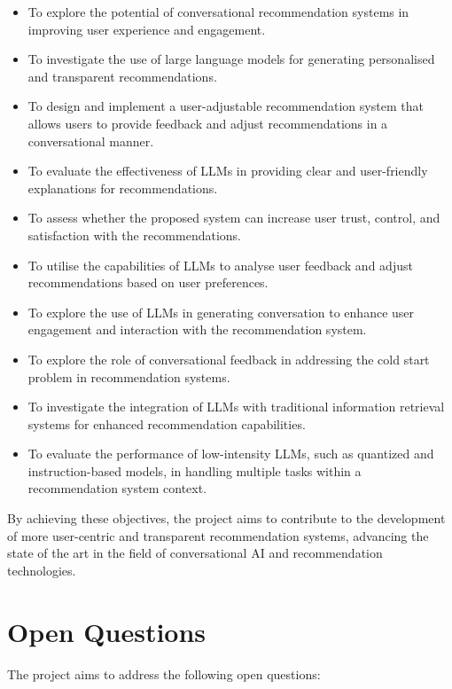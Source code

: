 \begin{itemize}
    \item To explore the potential of conversational recommendation systems in improving user experience and engagement.
    \item To investigate the use of large language models for generating personalised and transparent recommendations.
    \item To design and implement a user-adjustable recommendation system that allows users to provide feedback and adjust recommendations in a conversational manner.
    \item To evaluate the effectiveness of LLMs in providing clear and user-friendly explanations for recommendations.
    \item To assess whether the proposed system can increase user trust, control, and satisfaction with the recommendations.
    \item To utilise the capabilities of LLMs to analyse user feedback and adjust recommendations based on user preferences.
    \item To explore the use of LLMs in generating conversation to enhance user engagement and interaction with the recommendation system.
    \item To explore the role of conversational feedback in addressing the cold start problem in recommendation systems.
    \item To investigate the integration of LLMs with traditional information retrieval systems for enhanced recommendation capabilities.
    \item To evaluate the performance of low-intensity LLMs, such as quantized and instruction-based models, in handling multiple tasks within a recommendation system context.
\end{itemize}

By achieving these objectives, the project aims to contribute to the development of more user-centric and transparent recommendation systems, advancing the state of the art in the field of conversational AI and recommendation technologies.


\section{Open Questions}
\label{sec:open_questions}

The project aims to address the following open questions:

